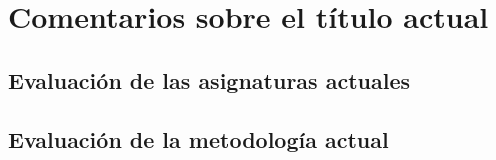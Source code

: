 \chapter{Comentarios sobre el título actual}


\section{Evaluación de las asignaturas actuales}

\section{Evaluación de la metodología actual}
